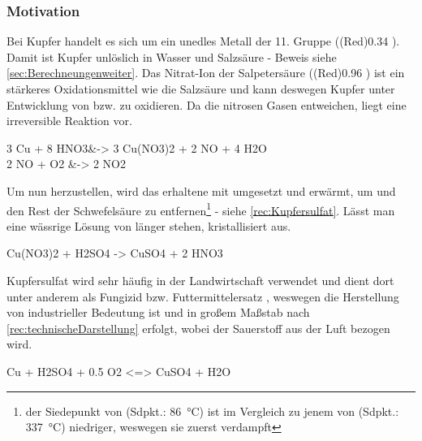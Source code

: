 \documentclass{article}
\begin{document}
      \subsubsection{Motivation} \label{sec:MotivationKupfer}
        
        Bei Kupfer handelt es sich um ein unedles Metall der 11. Gruppe (\ElPot[superscript=0](Red){0.34} \cite[S. 881]{PhysicalChemistryAtkings}). Damit ist Kupfer unlöslich in Wasser und Salzsäure - Beweis siehe \ref{sec:Berechneungenweiter}. Das Nitrat-Ion der Salpetersäure (\ElPot[superscript=0](Red){0.96} \cite[S. 881]{PhysicalChemistryAtkings}) ist ein stärkeres Oxidationsmittel wie die Salzsäure und kann deswegen Kupfer unter Entwicklung von  bzw.  zu  oxidieren. Da die nitrosen Gasen entweichen, liegt eine irreversible Reaktion vor.
        
        \begin{reactions}
          3 Cu\sld{} + 8 HNO3\aq &-> 3 Cu(NO3)2\aq{} + 2 NO\gas{} + 4 H2O \label{rec:LosenKupfereins} \\
          2 NO\gas{} + O2\gas{} &-> 2 NO2\gas{} 
        \end{reactions} 
        
        Um nun  herzustellen, wird das erhaltene  mit  umgesetzt und erwärmt, um  und den Rest der Schwefelsäure zu entfernen\footnote{der Siedepunkt von  (Sdpkt.: \SI[mode=text]{86}{\degreeCelsius}) ist im Vergleich zu jenem von  (Sdpkt.: \SI[mode=text]{337}{\degreeCelsius}) niedriger, weswegen sie zuerst verdampft} - siehe \ref{rec:Kupfersulfat}. Lässt man eine wässrige Lösung von  länger stehen, kristallisiert  aus.
        
        \begin{reaction}
          Cu(NO3)2\aq{} + H2SO4\aq{} -> CuSO4\aq{} + 2 HNO3\aq \label{rec:Kupfersulfat}
        \end{reaction} 
         
        Kupfersulfat wird sehr häufig in der Landwirtschaft verwendet und dient dort unter anderem als Fungizid bzw. Futtermittelersatz \cite{Kupfersulfat}, weswegen die Herstellung von industrieller Bedeutung ist und in großem Maßstab nach \ref{rec:technischeDarstellung} erfolgt, wobei der Sauerstoff aus der Luft bezogen wird.
        
        \begin{reaction}
          Cu\sld{} + H2SO4\aq{} + 0.5 O2\gas{} <=> CuSO4\aq{} + H2O \label{rec:technischeDarstellung}
        \end{reaction}
        
\end{document}
